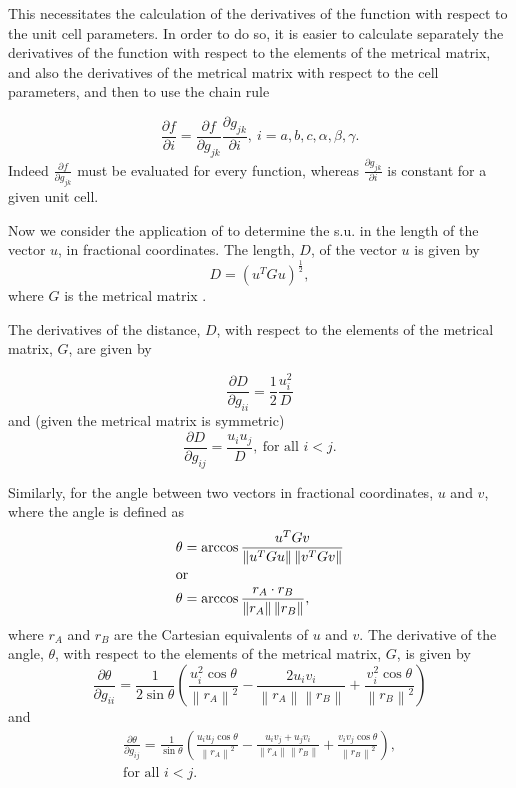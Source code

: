 \documentclass[pdf]{iucr}
\newcommand{\mat}[1]{#1}
\newcommand{\norm}[1]{\left\| #1 \right\|}
\newcommand{\partialder}[2]{\frac{\partial #1}{\partial #2}}
\begin{document}
This necessitates the calculation of the derivatives of the function with respect to the unit cell parameters. In order to do so, it is easier to calculate separately the derivatives of the function with respect to the elements of the metrical matrix, and also the derivatives of the metrical matrix with respect to the cell parameters, and then to use the chain rule

\begin{equation}
\partialder{f}{i} = \partialder{f}{g_{jk}}\partialder{g_{jk}}{i},\ i=a, b, c, \alpha, \beta, \gamma.
\label{eqn:df_dcell}
\end{equation}
Indeed $\partialder{f}{g_{jk}}$ must be evaluated for every function, whereas $\partialder{g_{jk}}{i}$ is constant for a given unit cell.

Now we consider the application of  to determine the s.u. in the length of the vector $u$, in fractional coordinates. The length, $D$, of the  vector $u$ is given by
\begin{equation}
D = (u^T \mat{G} u)^\frac{1}{2}
\label{eqn:bond_length},
\end{equation}
where $\mat{G}$ is the metrical matrix \textbookref.

The derivatives of the distance, $D$, with respect to the elements of the metrical matrix, $\mat{G}$, are given by

\begin{equation}
\partialder{D}{g_{ii}} = \frac{1}{2} \frac{u_i^2}{D}
\label{eqn:d_distance_d_gii}
\end{equation}
and (given the metrical matrix is symmetric)
\begin{equation}
\partialder{D}{g_{ij}} = \frac{u_i u_j}{D},\ \text{for all $i<j$}.
\label{eqn:d_distance_d_gij}
\end{equation}

Similarly, for the angle between two vectors in fractional coordinates, $u$ and $v$, where the angle is defined as
\begin{align}
\theta &= \arccos \frac{u^T\mat{G}v}{\norm{u^T\mat{G}u}\norm{v^T\mat{G}v}} \\
\shortintertext{or}
\theta &= \arccos \frac{r_{A}\cdot r_{B}}{\norm{r_{A}}\norm{r_{B}}}
\label{eqn:angle_cart},
\end{align}
where $r_{A}$ and $r_{B}$ are the Cartesian equivalents of $u$ and $v$. The derivative of the angle, $\theta$, with respect to the elements of the metrical matrix, $\mat{G}$, is given by
\begin{equation}
\partialder{\theta}{g_{ii}} = \frac{1}{2 \sin\theta} \left(\frac{u_i^2 \cos{\theta}}{\norm{r_{A}}^2} - \frac{2 u_i v_i }{\norm{r_{A}}\norm{r_{B}}} +\frac{v_i^2 \cos{\theta}}{\norm{r_{B}}^2}\right)
\label{eqn:d_angle_d_gii}
\end{equation}
and
\begin{multline}
\partialder{\theta}{g_{ij}} = \frac{1}{\sin\theta} \left(\frac{u_i u_j \cos{\theta}}{\norm{r_{A}}^2} - \frac{u_i v_j + u_j v_i }{\norm{r_{A}}\norm{r_{B}}} +\frac{v_i v_j \cos{\theta}}{\norm{r_{B}}^2}\right),\\ \text{for all $i<j$}.
\label{eqn:d_angle_d_gij}
\end{multline}
\end{document}
